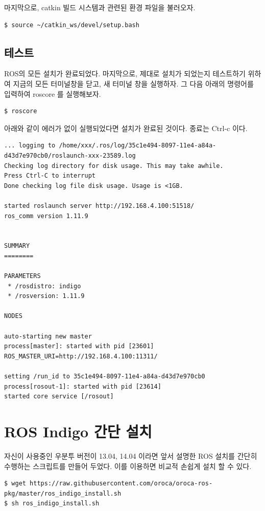 마지막으로, catkin 빌드 시스템과 관련된 환경 파일을 불러오자. 
\\
\begin{lstlisting}[language=ROS]
$ source ~/catkin_ws/devel/setup.bash
\end{lstlisting}

\subsection{테스트}

ROS의 모든 설치가 완료되었다. 마지막으로, 제대로 설치가 되었는지 테스트하기 위하여 지금의 모든 터미널창을 닫고, 새 터미널 창을 실행하자. 그 다음 아래의 명령어를 입력하여 roscore 를 실행해보자.
\\
\begin{lstlisting}[language=ROS]
$ roscore
\end{lstlisting}

\noindent
아래와 같이 에러가 없이 실행되었다면 설치가 완료된 것이다. 종료는 Ctrl-c 이다.
\\
\begin{lstlisting}[language=ROS]
... logging to /home/xxx/.ros/log/35c1e494-8097-11e4-a84a-d43d7e970cb0/roslaunch-xxx-23589.log
Checking log directory for disk usage. This may take awhile.
Press Ctrl-C to interrupt
Done checking log file disk usage. Usage is <1GB.

started roslaunch server http://192.168.4.100:51518/
ros_comm version 1.11.9


SUMMARY
========

PARAMETERS
 * /rosdistro: indigo
 * /rosversion: 1.11.9

NODES

auto-starting new master
process[master]: started with pid [23601]
ROS_MASTER_URI=http://192.168.4.100:11311/

setting /run_id to 35c1e494-8097-11e4-a84a-d43d7e970cb0
process[rosout-1]: started with pid [23614]
started core service [/rosout]
\end{lstlisting}

\section{ROS Indigo 간단 설치}
\label{sec:SimpleInstallation}

자신이 사용중인 우분투 버전이 13.04, 14.04 이라면 앞서 설명한 ROS 설치를 간단히 수행하는 스크립트를 만들어 두었다. 이를 이용하면 비교적 손쉽게 설치 할 수 있다.
\\
\begin{lstlisting}[language=ROS]
$ wget https://raw.githubusercontent.com/oroca/oroca-ros-pkg/master/ros_indigo_install.sh
$ sh ros_indigo_install.sh
\end{lstlisting}

